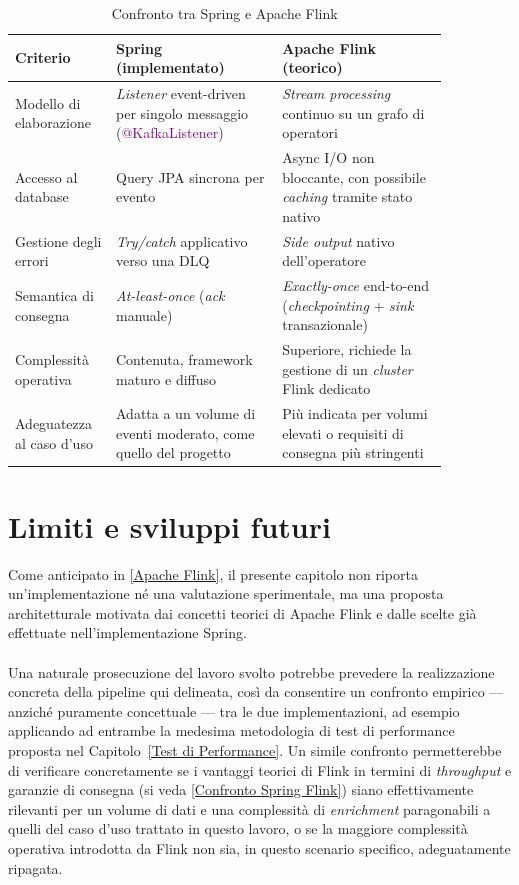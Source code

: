 \begin{table}[H]
    \setlength{\tabcolsep}{10pt}
    \def\arraystretch{1.5}
    \centering
    \begin{tabular}{|p{0.18\linewidth}|p{0.34\linewidth}|p{0.34\linewidth}|}
        \hline
        \textbf{Criterio} & \textbf{Spring (implementato)} & \textbf{Apache Flink (teorico)} \\
        \hline
        Modello di elaborazione & \textit{Listener} event-driven per singolo messaggio (\textcolor{purple}{@KafkaListener}) & \textit{Stream processing} continuo su un grafo di operatori \\ \hline
        Accesso al database & Query \acrshort{JPA} sincrona per evento & Async I/O non bloccante, con possibile \textit{caching} tramite stato nativo \\ \hline
        Gestione degli errori & \textit{Try/catch} applicativo verso una \acrshort{DLQ} & \textit{Side output} nativo dell'operatore \\ \hline
        Semantica di consegna & \textit{At-least-once} (\textit{ack} manuale) & \textit{Exactly-once} end-to-end (\textit{checkpointing} + \textit{sink} transazionale) \\ \hline
        Complessità operativa & Contenuta, framework maturo e diffuso & Superiore, richiede la gestione di un \textit{cluster} Flink dedicato \\ \hline
        Adeguatezza al caso d'uso & Adatta a un volume di eventi moderato, come quello del progetto & Più indicata per volumi elevati o requisiti di consegna più stringenti \\ \hline
    \end{tabular}
\caption{Confronto tra Spring e Apache Flink}
\label{Tabella confronto Spring Flink}
\end{table}

\section{Limiti e sviluppi futuri}
Come anticipato in \ref{Apache Flink}, il presente capitolo non riporta un'implementazione né una valutazione sperimentale, ma una proposta architetturale motivata dai concetti teorici di Apache Flink e dalle scelte già effettuate nell'implementazione Spring. \\ \\
Una naturale prosecuzione del lavoro svolto potrebbe prevedere la realizzazione concreta della pipeline qui delineata, così da consentire un confronto empirico — anziché puramente concettuale — tra le due implementazioni, ad esempio applicando ad entrambe la medesima metodologia di test di performance proposta nel Capitolo~\ref{Test di Performance}. Un simile confronto permetterebbe di verificare concretamente se i vantaggi teorici di Flink in termini di \textit{throughput} e garanzie di consegna (si veda \ref{Confronto Spring Flink}) siano effettivamente rilevanti per un volume di dati e una complessità di \textit{enrichment} paragonabili a quelli del caso d'uso trattato in questo lavoro, o se la maggiore complessità operativa introdotta da Flink non sia, in questo scenario specifico, adeguatamente ripagata.

\newpage
